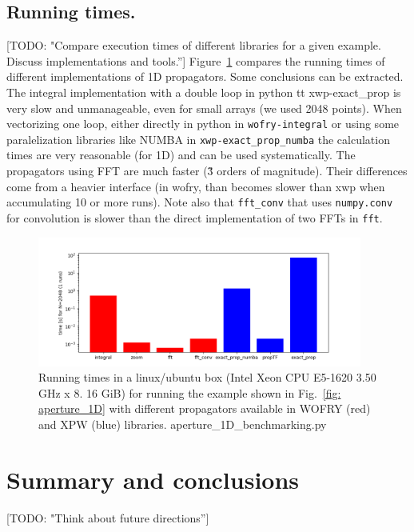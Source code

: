 \documentclass{iucr}              %
\newcommand{\todo}[1]{{\color{red}[TODO: "#1'']}}
\newcommand{\inblue}[1]{{\color{blue}#1}}
\begin{document}
\subsection{Running times.}
\todo{Compare execution times of different libraries for a given example. Discuss implementations and tools.}
Figure~\ref{fig: running times 1D} compares the running times of different implementations of 1D propagators. Some conclusions can be extracted. The integral implementation with a double loop in python {tt xwp-exact\_prop} is very slow and unmanageable, even for small arrays (we used 2048 points). When vectorizing one loop, either directly in python in {\tt wofry-integral} or using some paralelization libraries like NUMBA in {\tt xwp-exact\_prop\_numba} the calculation times are very reasonable (for 1D) and can be used systematically. The propagators using FFT are much faster (\~ 3 orders of magnitude). Their differences come from a heavier interface (in wofry, than becomes slower than xwp when accumulating 10 or more runs). Note also that {\tt fft\_conv} that uses {\tt numpy.conv} for convolution is slower than the direct implementation of two FFTs in {\tt fft}.   

\begin{figure}
\label{fig: running times 1D}
\caption{Running times in a linux/ubuntu box (Intel Xeon CPU E5-1620 3.50 GHz x 8. 16 GiB) for running the example shown in Fig.~\ref{fig: aperture_1D} with different propagators available in WOFRY (red) and XPW (blue) libraries. \inblue{aperture\_1D\_benchmarking.py}
}
\includegraphics[width=0.95\textwidth]{aperture_1D_benchmarking.png}
\end{figure}




\section{Summary and conclusions}

\todo{Think about future directions}
\end{document}
